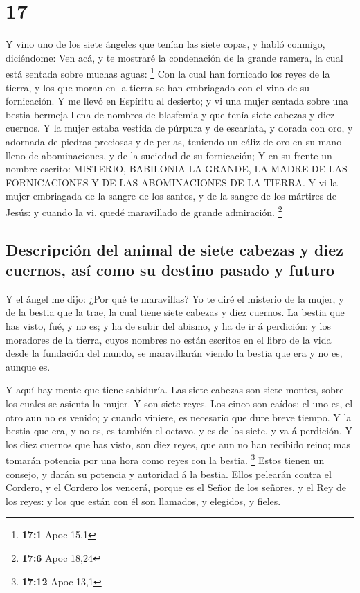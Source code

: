 \hypertarget{section-16}{%
\section{17}\label{section-16}}

 Y vino uno de los siete ángeles que tenían las siete
copas, y habló conmigo, diciéndome: Ven acá, y te mostraré la
condenación de la grande ramera, la cual está sentada sobre muchas
aguas: \footnote{\textbf{17:1} Apoc 15,1}  Con la cual han
fornicado los reyes de la tierra, y los que moran en la tierra se han
embriagado con el vino de su fornicación.  Y me llevó en
Espíritu al desierto; y vi una mujer sentada sobre una bestia bermeja
llena de nombres de blasfemia y que tenía siete cabezas y diez cuernos.
 Y la mujer estaba vestida de púrpura y de escarlata, y
dorada con oro, y adornada de piedras preciosas y de perlas, teniendo un
cáliz de oro en su mano lleno de abominaciones, y de la suciedad de su
fornicación;  Y en su frente un nombre escrito: MISTERIO,
BABILONIA LA GRANDE, LA MADRE DE LAS FORNICACIONES Y DE LAS
ABOMINACIONES DE LA TIERRA.  Y vi la mujer embriagada de
la sangre de los santos, y de la sangre de los mártires de Jesús: y
cuando la vi, quedé maravillado de grande admiración. \footnote{\textbf{17:6}
  Apoc 18,24}

\hypertarget{descripciuxf3n-del-animal-de-siete-cabezas-y-diez-cuernos-asuxed-como-su-destino-pasado-y-futuro}{%
\subsection{Descripción del animal de siete cabezas y diez cuernos, así
como su destino pasado y
futuro}\label{descripciuxf3n-del-animal-de-siete-cabezas-y-diez-cuernos-asuxed-como-su-destino-pasado-y-futuro}}

 Y el ángel me dijo: ¿Por qué te maravillas? Yo te diré el
misterio de la mujer, y de la bestia que la trae, la cual tiene siete
cabezas y diez cuernos.  La bestia que has visto, fué, y
no es; y ha de subir del abismo, y ha de ir á perdición: y los moradores
de la tierra, cuyos nombres no están escritos en el libro de la vida
desde la fundación del mundo, se maravillarán viendo la bestia que era y
no es, aunque es.

 Y aquí hay mente que tiene sabiduría. Las siete cabezas
son siete montes, sobre los cuales se asienta la mujer. 
Y son siete reyes. Los cinco son caídos; el uno es, el otro aun no es
venido; y cuando viniere, es necesario que dure breve tiempo.
 Y la bestia que era, y no es, es también el octavo, y es
de los siete, y va á perdición.  Y los diez cuernos que
has visto, son diez reyes, que aun no han recibido reino; mas tomarán
potencia por una hora como reyes con la bestia. \footnote{\textbf{17:12}
  Apoc 13,1}  Estos tienen un consejo, y darán su
potencia y autoridad á la bestia.  Ellos pelearán contra
el Cordero, y el Cordero los vencerá, porque es el Señor de los señores,
y el Rey de los reyes: y los que están con él son llamados, y elegidos,
y fieles.

